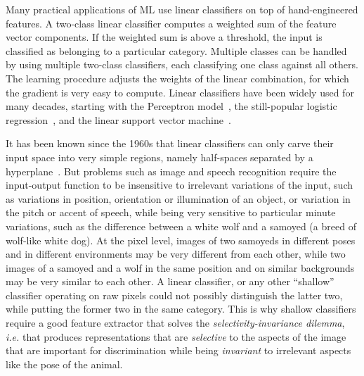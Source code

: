 \documentclass[10pts]{article}
\begin{document}
Many practical applications of ML use linear classifiers on top of
hand-engineered features. A two-class linear classifier computes a
weighted sum of the feature vector components. If the weighted sum is
above a threshold, the input is classified as belonging to a
particular category. Multiple classes can be handled by using multiple
two-class classifiers, each classifying one class against all
others. The learning procedure adjusts the weights of the linear
combination, for which the gradient is very easy to compute. Linear
classifiers have been widely used for many decades, starting with the
Perceptron model~\citep{Rosenblatt57}, the still-popular logistic
regression~\cite{Hastie2001}, and the linear support vector
machine~\cite{Vapnik+Chervonenkis-1964}. %

It has been known since the 1960s that linear classifiers can only
carve their input space into very simple regions, namely
half-spaces separated by a hyperplane~\citep{Duda-Hart}.  But problems
such as image and speech recognition require the input-output function
to be insensitive to irrelevant variations of the input, such as
variations in position, orientation or illumination of an object, or
variation in the pitch or accent of speech, while being very sensitive to
particular minute variations, such as the difference between a white
wolf and a samoyed (a breed of wolf-like white dog).  At the pixel
level, images of two samoyeds in different poses and in different
environments may be very different from each other, while two images
of a samoyed and a wolf in the same position and on similar
backgrounds may be very similar to each other. A linear classifier,
or any other ``shallow'' classifier operating on raw pixels could not
possibly distinguish the latter two, while putting the former two in
the same category. This is why shallow classifiers require a good
feature extractor that solves the {\em selectivity-invariance dilemma},
{\it i.e.} that produces representations that are {\em selective} to the
aspects of the image that are important for discrimination while being {\em invariant} to 
irrelevant aspects like the pose of the animal.
%
\end{document}
